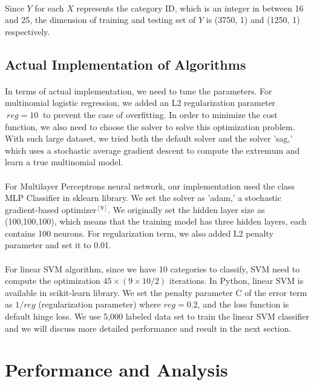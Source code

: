 \documentclass{article}
\begin{document}
\paragraph{}
Since $Y$ for each $X$ represents the category ID, which is an integer in between 16 and 25, the dimension of training and testing set of $Y$ is (3750, 1) and  (1250, 1) respectively.
 

\subsection{Actual Implementation of Algorithms}
\paragraph{}
In terms of actual implementation, we need to tune the parameters. For multinomial logistic regression, we added an L2 regularization parameter $ \ reg=10\ $ to prevent the case of overfitting. In order to minimize the cost function, we also need to choose the solver to solve this optimization problem. With such large dataset, we tried both the default solver and the solver 'sag,' which uses a stochastic average gradient descent to compute the extremum and learn a true multinomial model. 
\paragraph{}
 For Multilayer Perceptrons neural network, our implementation used the class MLP Classifier in sklearn library. We set the solver as 'adam,' a stochastic gradient-based optimizer$^{[9]}$. We originally set the hidden layer size as (100,100,100), which means that the training model has three hidden layers, each contains 100 neurons. For regularization term, we also added L2 penalty parameter and set it to 0.01.
\paragraph{}
For linear SVM algorithm, since we have 10 categories to classify, SVM need to compute the optimization $45 \times (9 \times 10 \slash 2)$ iterations. In Python, linear SVM is  available in scikit-learn library. We set the penalty parameter C of the error term as $1\slash reg$ (regularization parameter) where $reg = 0.2$, and the loss function is default hinge loss. We use 5,000 labeled data set to train the linear SVM classifier and we will discuss more detailed performance and result in the next section.
 

\section{Performance and Analysis}
\end{document}
